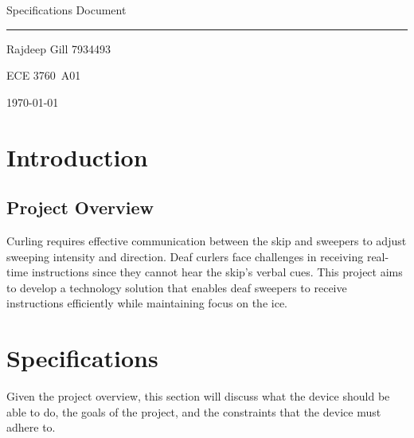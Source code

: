 \documentclass{article}
\def\me{Rajdeep Gill 7934493}
\def\course{ECE 3760}
\def\labsection{A01}
\def\title{Specifications Document}
\begin{document}

\begin{center}
    \huge \title

    \vspace{2mm}
    \hrule

    \vspace{4mm}
    \large \me

    \vspace{2mm}
    \large \course~\labsection

    \vspace{2mm}
    \today
\end{center}

\vspace{4mm}


\newpage


\vspace{1cm}
\newpage





\section{Introduction}
\subsection{Project Overview}
Curling requires effective communication between the skip and sweepers to adjust sweeping intensity and direction. Deaf curlers face challenges in receiving real-time instructions since they cannot hear the skip's verbal cues. This project aims to develop a technology solution that enables deaf sweepers to receive instructions efficiently while maintaining focus on the ice.

\section{Specifications}
Given the project overview, this section will discuss what the device should be able to do, the goals of the project, and the constraints that the device must adhere to.
\end{document}
